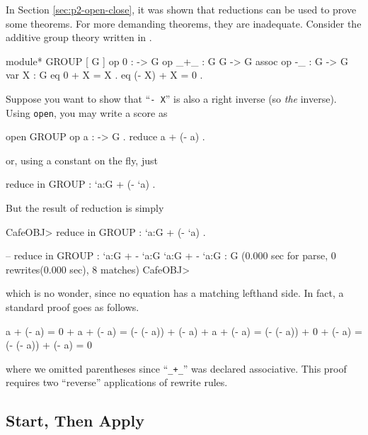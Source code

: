 \documentclass[a4paper]{memoir}
\begin{document}
In Section \ref{sec:p2-open-close}, it was shown that reductions can be
used to prove some theorems. For more demanding theorems, they are
inadequate. Consider the additive group theory written in \cafeobj.
\label{exs:group}
\begin{vvtm}
\begin{ccode}
  module* GROUP {
    [ G ]
    op 0 : -> G
    op _+_ : G G -> G { assoc }
    op -_ : G -> G
    var X : G
    eq 0 + X = X .
    eq (- X) + X = 0 .
  }
\end{ccode}
\end{vvtm}
Suppose you want to show that ``\verb|- X|'' is also a right inverse
(so {\em the} inverse). Using \verb|open|, you may write a score as
\begin{vvtm}
\begin{ccode}
  open GROUP
  op a : -> G .
  reduce a + (- a) .
\end{ccode}
\end{vvtm}
or, using a constant on the fly, just
\begin{vvtm}
\begin{ccode}
  reduce in GROUP : `a:G + (- `a) .
\end{ccode}
\end{vvtm}
But the result of reduction is simply
\begin{vvtm}
\begin{ccode}
  CafeOBJ> reduce in GROUP : `a:G + (- `a) .

  -- reduce in GROUP : `a:G + - `a:G
  `a:G + - `a:G : G
  (0.000 sec for parse, 0 rewrites(0.000 sec), 8 matches)
  CafeOBJ> 
\end{ccode}
\end{vvtm}
which is no wonder, since no equation has a matching lefthand side.
In fact, a standard proof goes as follows.
\begin{vvtm}
\begin{ccode}
  a + (- a) =
  0 + a + (- a) =
  (- (- a)) + (- a) + a + (- a) =
  (- (- a)) + 0 + (- a) =
  (- (- a)) + (- a) =
  0
\end{ccode}
\end{vvtm}
where we omitted parentheses since ``\verb|_+_|'' was declared associative.
This proof requires two ``reverse'' applications of rewrite rules.

\subsection{Start, Then Apply}\label{sec:p2-apply-command}
\end{document}
